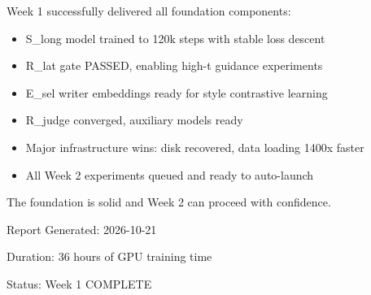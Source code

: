 \documentclass[12pt,a4paper]{article}
\begin{document}
Week 1 successfully delivered all foundation components:

\begin{itemize}
  \item S\_long model trained to 120k steps with stable loss descent
  \item R\_lat gate PASSED, enabling high-t guidance experiments
  \item E\_sel writer embeddings ready for style contrastive learning
  \item R\_judge converged, auxiliary models ready
  \item Major infrastructure wins: disk recovered, data loading 1400x faster
  \item All Week 2 experiments queued and ready to auto-launch
\end{itemize}

The foundation is solid and Week 2 can proceed with confidence.

\vspace{2cm}

\noindent
Report Generated: 2026-10-21

\noindent
Duration: 36 hours of GPU training time

\noindent
Status: Week 1 COMPLETE
\end{document}
